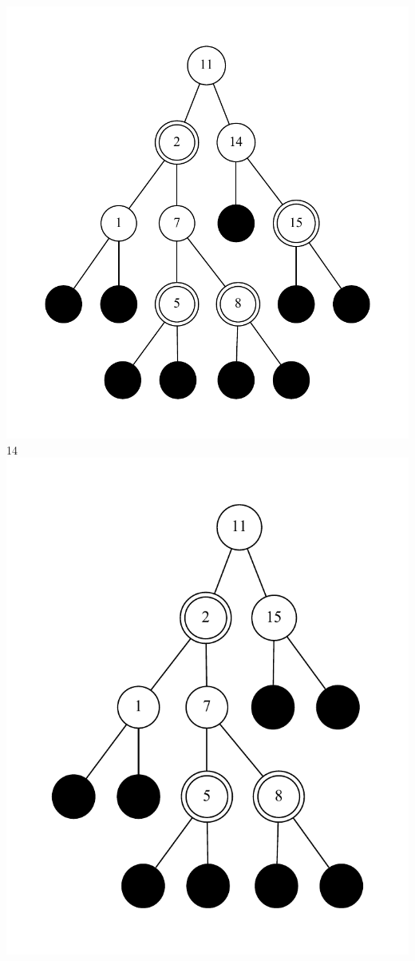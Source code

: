 \documentclass[11pt]{article}
\begin{document}
	\\
	
\includegraphics{bstep0.pdf}\\
	14\\
\includegraphics{bstep1.pdf}\\
\end{document}
